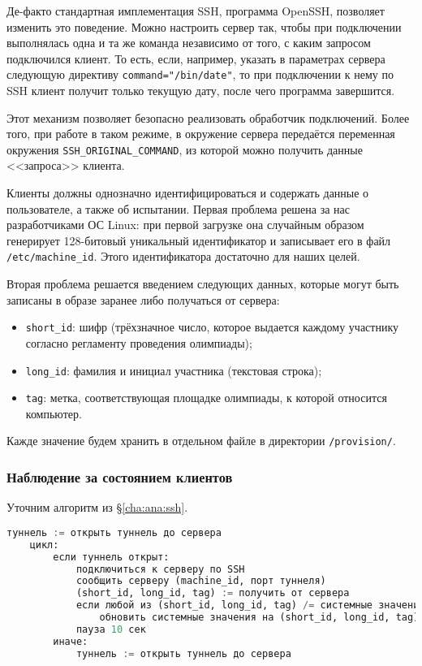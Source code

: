 Де-факто стандартная имплементация SSH, программа OpenSSH, позволяет изменить это поведение. Можно настроить сервер так, чтобы при подключении выполнялась одна и та же команда независимо от того, с каким запросом подключился клиент. То есть, если, например, указать в параметрах сервера следующую директиву \texttt{command="/bin/date"}, то при подключении к нему по SSH клиент получит только текущую дату, после чего программа завершится.

Этот механизм позволяет безопасно реализовать обработчик подключений. Более того, при работе в таком режиме, в окружение сервера передаётся переменная окружения \texttt{SSH\_ORIGINAL\_COMMAND}, из которой можно получить данные <<запроса>> клиента.

Клиенты должны однозначно идентифицироваться и содержать данные о пользователе, а также об испытании. Первая проблема решена за нас разработчиками ОС Linux: при первой загрузке она случайным образом генерирует 128-битовый уникальный идентификатор и записывает его в файл \texttt{/etc/machine\_id}. Этого идентификатора достаточно для наших целей.

Вторая проблема решается введением следующих данных, которые могут быть записаны в образе заранее либо получаться от сервера:

\begin{itemize}
\item \texttt{short\_id}: шифр (трёхзначное число, которое выдается каждому участнику согласно регламенту проведения олимпиады);
\item \texttt{long\_id}: фамилия и инициал участника (текстовая строка);
\item \texttt{tag}: метка, соответствующая площадке олимпиады, к которой относится компьютер.
\end{itemize}

Кажде значение будем хранить в отдельном файле в директории \texttt{/provision/}.

\subsubsection{Наблюдение за состоянием клиентов}

Уточним алгоритм из \S \ref{cha:ana:ssh}.

\begin{lstlisting}[language=python,caption={Алгоритм клиента (псевдокод)}]
    туннель := открыть туннель до сервера
    цикл:
        если туннель открыт:
            подключиться к серверу по SSH
            сообщить серверу (machine_id, порт туннеля)
            (short_id, long_id, tag) := получить от сервера
            если любой из (short_id, long_id, tag) /= системные значения:
                обновить системные значения на (short_id, long_id, tag)
            пауза 10 сек
        иначе:
            туннель := открыть туннель до сервера
\end{lstlisting}


